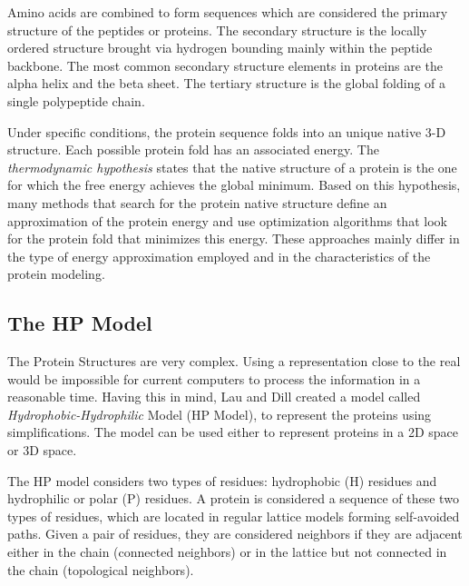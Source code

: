 Amino acids are combined to form sequences which are considered the primary structure of the peptides or proteins. The secondary structure is the locally ordered structure brought via hydrogen bounding mainly within the peptide backbone. The most common secondary structure elements in proteins are the alpha helix and the beta sheet. The tertiary structure is the global folding of a single polypeptide chain.


Under specific conditions, the protein sequence folds into an unique native 3-D structure. Each possible protein fold has an associated energy. The \emph{thermodynamic hypothesis} states that the native structure of a protein is the one for which the free energy achieves the global minimum. Based on this hypothesis, many methods \cite{custodio2004investigation, hsu2003growth, krasnogor2002multimeme, lin2011protein, unger1993genetic} that search for the protein native structure define an approximation of the protein energy and use optimization algorithms that look for the protein fold that minimizes this energy. These approaches mainly differ in the type of energy approximation employed and in the characteristics of the protein modeling.


\subsection{The HP Model} \label{sec:hpModel}


The Protein Structures are very complex. Using a representation close to the real would be impossible for current computers to process the information in a reasonable time. Having this in mind, Lau and Dill \cite{lau1989lattice} created a model called \textit{Hydrophobic-Hydrophilic} Model (HP Model), to represent the proteins using simplifications. The model can be used either to represent proteins in a 2D space or 3D space.


The HP model considers two types of residues:  hydrophobic (H) residues  and hydrophilic or polar (P) residues. A protein is considered a sequence of these two types of residues, which are located in regular lattice models forming self-avoided paths. Given a pair of residues, they are considered neighbors if they are adjacent  either in the chain (connected neighbors) or  in the lattice but not connected in the chain (topological neighbors).


